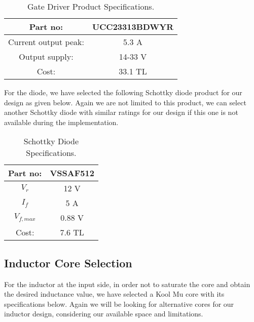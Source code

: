 \begin{table}[H]
    \centering
    \caption{Gate Driver Product Specifications.\cite{web:gate_driver}}
    \label{tab:gate_driver}
    \begin{tabular}{|c|c|}
         \hline
         Part no:               & UCC23313BDWYR     \\
         \hline
         Current output peak:   & 5.3 A             \\
         \hline
         Output supply:         & 14-33 V           \\
         \hline
         Cost:                  & 33.1 TL           \\
         \hline
    \end{tabular}
\end{table}

For the diode, we have selected the following Schottky diode product for our design as given below. Again we are not limited to this product, we can select another Schottky diode with similar ratings for our design if this one is not available during the implementation.

\begin{table}[H]
    \centering
    \caption{Schottky Diode Specifications.\cite{web:diode}}
    \label{tab:diode}
    \begin{tabular}{|c|c|}
        \hline
        Part no:            & VSSAF512          \\
        \hline
        $V_r$               & 12 V              \\
        \hline
        $I_f$               & 5 A               \\
        \hline
        $V_{f,max}$         & 0.88 V            \\
        \hline
        Cost:               & 7.6 TL            \\
        \hline
    \end{tabular}
\end{table}


\subsection{Inductor Core Selection}
For the inductor at the input side, in order not to saturate the core and obtain the desired inductance value, we have selected a Kool Mu core with its specifications below. Again we will be looking for alternative cores for our inductor design, considering our available space and limitations.

